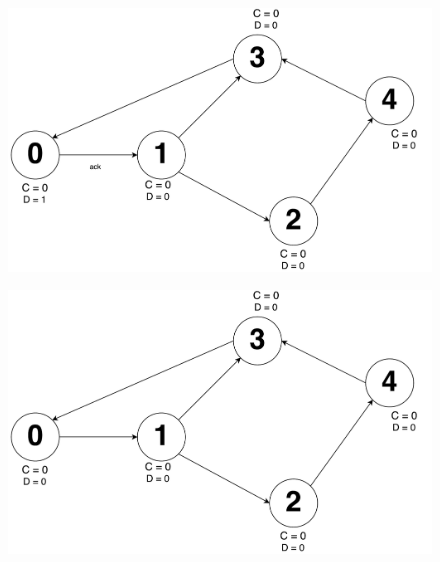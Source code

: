 \documentclass[times]{article}
\begin{document}
		\begin{figure}[H]
			\includegraphics[width=\linewidth]{q2/9.pdf}
		\end{figure}
		\begin{figure}[H]
			\includegraphics[width=\linewidth]{q2/10.pdf}
		\end{figure}
	
	
	

	
	
		
\end{document}
